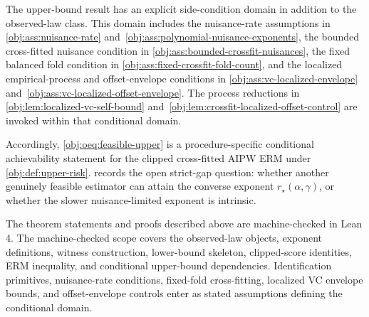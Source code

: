 The upper-bound result has an explicit side-condition domain in addition to the observed-law class.  This domain includes the nuisance-rate assumptions in \cref{obj:ass:nuisance-rate} and~\cref{obj:ass:polynomial-nuisance-exponents}, the bounded cross-fitted nuisance condition in \cref{obj:ass:bounded-crossfit-nuisances}, the fixed balanced fold condition in \cref{obj:ass:fixed-crossfit-fold-count}, and the localized empirical-process and offset-envelope conditions in \cref{obj:ass:vc-localized-envelope} and~\cref{obj:ass:vc-localized-offset-envelope}.  The process reductions in \cref{obj:lem:localized-vc-self-bound} and~\cref{obj:lem:crossfit-localized-offset-control} are invoked within that conditional domain.

Accordingly, \cref{obj:oeq:feasible-upper} is a procedure-specific conditional achievability statement for the clipped cross-fitted AIPW ERM under \cref{obj:def:upper-risk}.   records the open strict-gap question: whether another genuinely feasible estimator can attain the converse exponent \(r_\star(\alpha,\gamma)\), or whether the slower nuisance-limited exponent is intrinsic.

The theorem statements and proofs described above are machine-checked in Lean 4.  The machine-checked scope covers the observed-law objects, exponent definitions, witness construction, lower-bound skeleton, clipped-score identities, ERM inequality, and conditional upper-bound dependencies.  Identification primitives, nuisance-rate conditions, fixed-fold cross-fitting, localized VC envelope bounds, and offset-envelope controls enter as stated assumptions defining the conditional domain.
